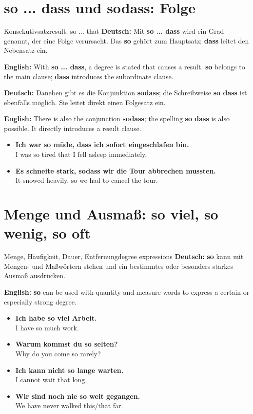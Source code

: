 \documentclass[a4paper,11pt]{article}
\newcommand{\GermanText}[1]{\textbf{Deutsch: }#1\par}
\newcommand{\EnglishText}[1]{{\small\color{SoftGray}\textbf{English: }#1\par}}
\newcommand{\ExampleItem}[2]{\item \textbf{#1}\\{\small\color{SoftGray}#2}}
\begin{document}
    \section{\glqq so ... dass\grqq{} und \glqq sodass\grqq: Folge}

        \begin{grammarentry}{Konsekutivsatz}{result: so ... that}
            \GermanText{Mit \textbf{so ... dass} wird ein Grad genannt, der eine Folge verursacht. Das \textbf{so} gehört zum Hauptsatz; \textbf{dass} leitet den Nebensatz ein.}
            \EnglishText{With \textbf{so ... dass}, a degree is stated that causes a result. \textbf{so} belongs to the main clause; \textbf{dass} introduces the subordinate clause.}

            \GermanText{Daneben gibt es die Konjunktion \textbf{sodass}; die Schreibweise \textbf{so dass} ist ebenfalls möglich. Sie leitet direkt einen Folgesatz ein.}
            \EnglishText{There is also the conjunction \textbf{sodass}; the spelling \textbf{so dass} is also possible. It directly introduces a result clause.}
        \end{grammarentry}

        \begin{exbox}
            \begin{itemize}
                \ExampleItem{Ich war so müde, dass ich sofort eingeschlafen bin.}{I was so tired that I fell asleep immediately.}
                \ExampleItem{Es schneite stark, sodass wir die Tour abbrechen mussten.}{It snowed heavily, so we had to cancel the tour.}
            \end{itemize}
        \end{exbox}

    \section{Menge und Ausmaß: \glqq so viel\grqq, \glqq so wenig\grqq, \glqq so oft\grqq}

        \begin{grammarentry}{Menge, Häufigkeit, Dauer, Entfernung}{degree expressions}
            \GermanText{\textbf{so} kann mit Mengen- und Maßwörtern stehen und ein bestimmtes oder besonders starkes Ausmaß ausdrücken.}
            \EnglishText{\textbf{so} can be used with quantity and measure words to express a certain or especially strong degree.}
        \end{grammarentry}

        \begin{exbox}
            \begin{itemize}
                \ExampleItem{Ich habe so viel Arbeit.}{I have so much work.}
                \ExampleItem{Warum kommst du so selten?}{Why do you come so rarely?}
                \ExampleItem{Ich kann nicht so lange warten.}{I cannot wait that long.}
                \ExampleItem{Wir sind noch nie so weit gegangen.}{We have never walked this/that far.}
            \end{itemize}
        \end{exbox}
\end{document}
